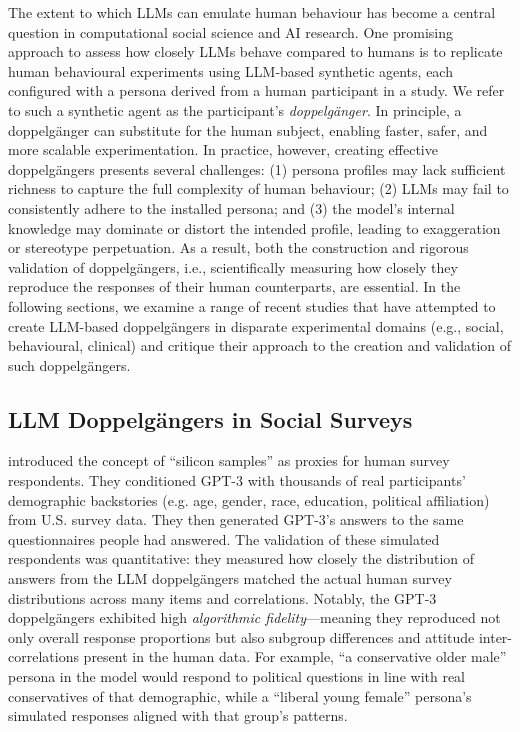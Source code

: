 The extent to which LLMs can emulate human behaviour has become a central question in computational social science and AI research. One promising approach to assess how closely LLMs behave compared to humans is to replicate human behavioural experiments using LLM-based synthetic agents, each configured with a persona derived from a human participant in a study. We refer to such a synthetic agent as the participant's \emph{doppelgänger}. In principle, a doppelgänger can substitute for the human subject, enabling faster, safer, and more scalable experimentation. In practice, however, creating effective doppelgängers presents several challenges: (1) persona profiles may lack sufficient richness to capture the full complexity of human behaviour; (2) LLMs may fail to consistently adhere to the installed persona; and (3) the model's internal knowledge may dominate or distort the intended profile, leading to exaggeration or stereotype perpetuation. As a result, both the construction and rigorous validation of doppelgängers, i.e., scientifically measuring how closely they reproduce the responses of their human counterparts, are essential. In the following sections, we examine a range of recent studies that have attempted to create LLM-based doppelgängers in disparate experimental domains (e.g., social, behavioural, clinical) and critique their approach to the creation and validation of such doppelgängers.


\subsection*{LLM Doppelgängers in Social Surveys}
\citet{argyle2023} introduced the concept of ``silicon samples'' as proxies for human survey respondents. They conditioned GPT-3 with thousands of real participants' demographic backstories (e.g. age, gender, race, education, political affiliation) from U.S. survey data. They then generated GPT-3's answers to the same questionnaires people had answered. The validation of these simulated respondents was quantitative: they measured how closely the distribution of answers from the LLM doppelgängers matched the actual human survey distributions across many items and correlations. Notably, the GPT-3 doppelgängers exhibited high \textit{algorithmic fidelity}---meaning they reproduced not only overall response proportions but also subgroup differences and attitude inter-correlations present in the human data. For example, ``a conservative older male'' persona in the model would respond to political questions in line with real conservatives of that demographic, while a ``liberal young female'' persona’s simulated responses aligned with that group’s patterns.


